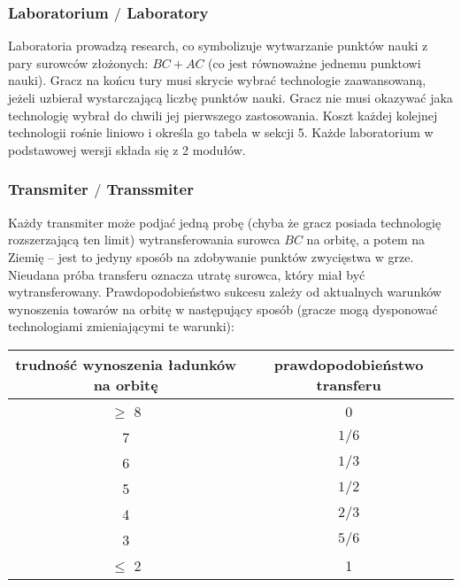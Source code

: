 \documentclass[11pt,a4paper]{article}
\begin{document}
\subsubsection{Laboratorium $/$ Laboratory}

Laboratoria prowadzą research, co symbolizuje wytwarzanie punktów nauki z pary surowców złożonych: $BC + AC$ (co jest równoważne jednemu punktowi nauki). Gracz na końcu tury musi skrycie wybrać technologie zaawansowaną, jeżeli uzbierał wystarczającą liczbę punktów nauki. Gracz nie musi okazywać jaka technologię wybrał do chwili jej pierwszego zastosowania. Koszt każdej kolejnej technologii rośnie liniowo i określa go tabela w sekcji 5. Każde laboratorium w podstawowej wersji składa się z 2 modułów. 

\subsubsection{Transmiter $/$ Transsmiter}

Każdy transmiter może podjać jedną probę (chyba że gracz posiada technologię rozszerzającą ten limit) wytransferowania surowca $BC$ na orbitę, a potem na Ziemię -- jest to jedyny sposób na zdobywanie punktów zwycięstwa w grze. Nieudana próba transferu oznacza utratę surowca, który miał być wytransferowany. Prawdopodobieństwo sukcesu zależy od aktualnych warunków wynoszenia towarów na orbitę w następujący sposób (gracze mogą dysponować technologiami zmieniającymi te warunki):
\begin{center}
  \begin{tabular}{| c | c |}
    \hline
    \textbf{trudność wynoszenia ładunków na orbitę} & \textbf{prawdopodobieństwo transferu}\\
    \hline
     $\ge$ 8 & 0 \\
    \hline
    7 & $1/6$ \\
    \hline
    6 & $1/3$ \\
    \hline
    5 & $1/2$ \\
    \hline
    4 & $2/3$ \\
    \hline
    3 & $5/6$ \\
    \hline
     $\le$ 2  & 1 \\
    \hline
  \end{tabular}
\end{center}
\end{document}
